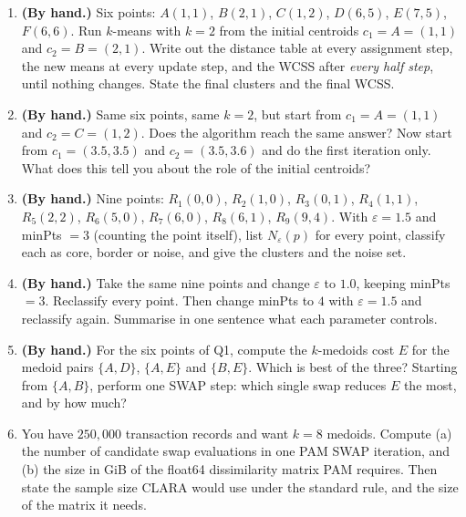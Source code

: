\documentclass[11pt]{article}
\begin{document}
\begin{enumerate}[leftmargin=*, label=\textbf{Q\arabic*.}]
  \item \textbf{(By hand.)} Six points:
    $A(1,1)$, $B(2,1)$, $C(1,2)$, $D(6,5)$, $E(7,5)$, $F(6,6)$. Run
    $k$-means with $k = 2$ from the initial centroids $c_1 = A = (1,1)$ and
    $c_2 = B = (2,1)$. Write out the distance table at every assignment step,
    the new means at every update step, and the WCSS after \emph{every half
    step}, until nothing changes. State the final clusters and the final
    WCSS.

  \item \textbf{(By hand.)} Same six points, same $k = 2$, but start from
    $c_1 = A = (1,1)$ and $c_2 = C = (1,2)$. Does the algorithm reach the same
    answer? Now start from $c_1 = (3.5, 3.5)$ and $c_2 = (3.5, 3.6)$ and do
    the first iteration only. What does this tell you about the role of the
    initial centroids?

  \item \textbf{(By hand.)} Nine points:
    $R_1(0,0)$, $R_2(1,0)$, $R_3(0,1)$, $R_4(1,1)$, $R_5(2,2)$, $R_6(5,0)$,
    $R_7(6,0)$, $R_8(6,1)$, $R_9(9,4)$. With $\varepsilon = 1.5$ and
    minPts $= 3$ (counting the point itself), list $N_\varepsilon(p)$ for
    every point, classify each as core, border or noise, and give the
    clusters and the noise set.

  \item \textbf{(By hand.)} Take the same nine points and change
    $\varepsilon$ to $1.0$, keeping minPts $= 3$. Reclassify every point.
    Then change minPts to $4$ with $\varepsilon = 1.5$ and reclassify again.
    Summarise in one sentence what each parameter controls.

  \item \textbf{(By hand.)} For the six points of Q1, compute the
    $k$-medoids cost $E$ for the medoid pairs $\{A, D\}$, $\{A, E\}$ and
    $\{B, E\}$. Which is best of the three? Starting from $\{A, B\}$,
    perform one SWAP step: which single swap reduces $E$ the most, and by
    how much?

  \item You have $250{,}000$ transaction records and want $k = 8$ medoids.
    Compute (a) the number of candidate swap evaluations in one PAM SWAP
    iteration, and (b) the size in GiB of the float64 dissimilarity matrix
    PAM requires. Then state the sample size CLARA would use under the
    standard rule, and the size of the matrix it needs.


\end{enumerate}
\end{document}

